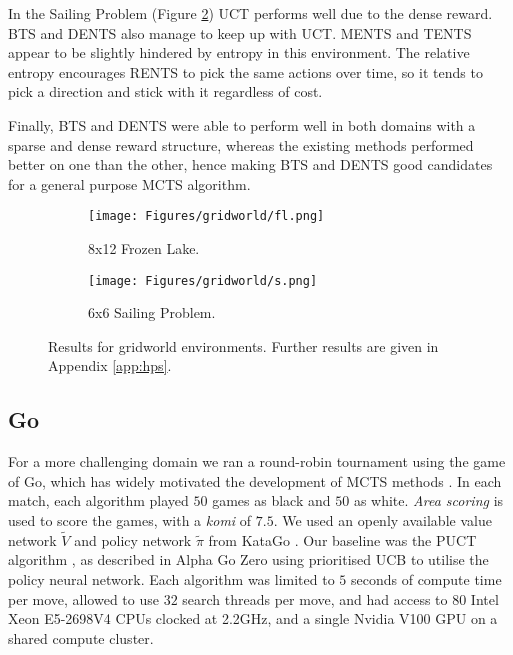 \documentclass{article}
\theoremstyle{plain}
\begin{document}
        In the Sailing Problem (Figure \ref{fig:sp}) UCT performs well due to the dense reward. BTS and DENTS also manage to keep up with UCT. MENTS and TENTS appear to be slightly hindered by entropy in this environment. The relative entropy encourages RENTS to pick the same actions over time, so it tends to pick a direction and stick with it regardless of cost.
        
        Finally, BTS and DENTS were able to perform well in both domains with a sparse and dense reward structure, whereas the existing methods performed better on one than the other, hence making BTS and DENTS good candidates for a general purpose MCTS algorithm.
        
        \begin{figure*}
            \centering
            \begin{subfigure}[b]{0.49\textwidth}
                \centering
                \texttt{[image: Figures/gridworld/fl.png]}
                \caption{8x12 Frozen Lake.}
                \label{fig:fl}
            \end{subfigure}
            \begin{subfigure}[b]{0.49\textwidth}
                \centering
                \texttt{[image: Figures/gridworld/s.png]}
                \caption{6x6 Sailing Problem.}
                \label{fig:sp}
            \end{subfigure}
            \caption{Results for gridworld environments. Further results are given in Appendix \ref{app:hps}.}
            \label{fig:gridworld_results}
        \end{figure*}
    
    
    
    \subsection{Go} \label{sec:go}
        For a more challenging domain we ran a round-robin tournament using the game of Go, which has widely motivated the development of MCTS methods \cite{gelly2007combining,silver2016mastering,silver2017mastering}. 
        In each match, each algorithm played $50$ games as black and $50$ as white. \textit{Area scoring} is used to score the games, with a \textit{komi} 
        of $7.5$. 
        We used an openly available value network $\tilde{V}$ and policy network $\tilde{\pi}$ from KataGo \cite{katago}. Our baseline was the PUCT algorithm \cite{poly_uct2}, as described in Alpha Go Zero \cite{silver2017mastering} using prioritised UCB \cite{prioritised_ucb} to utilise the policy neural network. Each algorithm was limited to $5$ seconds of compute time per move, allowed to use $32$ search threads per move, and had access to 80 Intel Xeon E5-2698V4 CPUs clocked at 2.2GHz, and a single Nvidia V100 GPU on a shared compute cluster.
        
\end{document}
